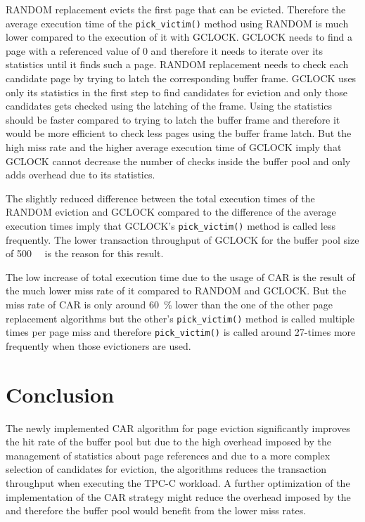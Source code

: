     RANDOM replacement evicts the first page that can be evicted. Therefore the average execution time of the \lstinline{pick_victim()} method using RANDOM is much lower compared to the execution of it with GCLOCK. GCLOCK needs to find a page with a referenced value of \num{0} and therefore it needs to iterate over its statistics until it finds such a page. RANDOM replacement needs to check each candidate page by trying to latch the corresponding buffer frame. GCLOCK uses only its statistics in the first step to find candidates for eviction and only those candidates gets checked using the latching of the frame. Using the statistics should be faster compared to trying to latch the buffer frame and therefore it would be more efficient to check less pages using the buffer frame latch. But the high miss rate and the higher average execution time of GCLOCK imply that GCLOCK cannot decrease the number of checks inside the buffer pool and only adds overhead due to its statistics.

    The slightly reduced difference between the total execution times of the RANDOM eviction and GCLOCK compared to the difference of the average execution times imply that GCLOCK's \lstinline{pick_victim()} method is called less frequently. The lower transaction throughput of GCLOCK for the buffer pool size of \SI{500}{\mebi\byte} is the reason for this result.

    The low increase of total execution time due to the usage of CAR is the result of the much lower miss rate of it compared to RANDOM and GCLOCK. But the miss rate of CAR is only around \SI{60}{\percent} lower than the one of the other page replacement algorithms but the other's \lstinline{pick_victim()} method is called multiple times per page miss and therefore \lstinline{pick_victim()} is called around 27-times more frequently when those evictioners are used.

\section{Conclusion}

    The newly implemented CAR algorithm \cite{Bansal:2004} for page eviction significantly improves the hit rate of the buffer pool but due to the high overhead imposed by the management of statistics about page references and due to a more complex selection of candidates for eviction, the algorithms reduces the transaction throughput when executing the TPC-C workload. A further optimization of the implementation of the CAR strategy might reduce the overhead imposed by the and therefore the buffer pool would benefit from the lower miss rates.

